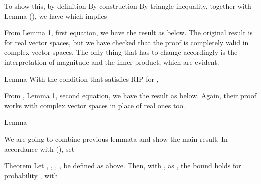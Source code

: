 To show this, by definition
By construction
By triangle inequality, together with Lemma (), we have
which implies

From  Lemma 1, first equation, we have the result as below.
The original result is for real vector spaces, but we have checked that the proof is completely valid in complex vector spaces.
The only thing that has to change accordingly is the interpretation of magnitude and the inner product, which are evident.

\Result
{Lemma}
{
With the condition that  satisfies RIP for ,
}

From , Lemma 1, second equation, we have the result as below.
Again, their proof works with complex vector spaces in place of real ones too.

\Result
{Lemma}
{
}

\stopsubsection

\startsubsection [title={Main Result}]

We are going to combine previous lemmata and show the main result.
In accordance with (), set

\Result
{Theorem}
{
Let , , , ,  be defined as above.
Then, with , as ,
the bound holds for probability , with
}

